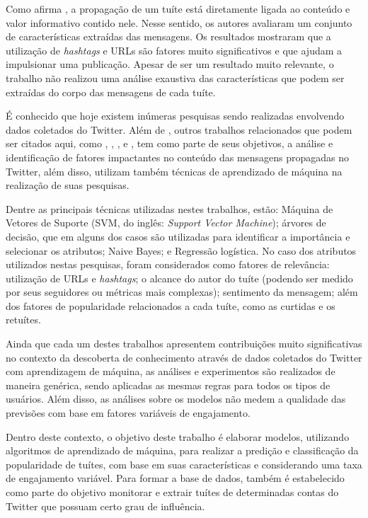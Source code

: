\documentclass[oneside,openright,12pt]{ufsm_2015} %
\begin{document}
{    \par Como afirma \cite{ieee:suh:10}, a propagação de um tuíte está diretamente ligada ao conteúdo e valor informativo contido nele. Nesse sentido, os autores avaliaram um conjunto de características extraídas das mensagens. Os resultados mostraram que a utilização de \textit{hashtags} e URLs são fatores muito significativos e que ajudam a impulsionar uma publicação. Apesar de ser um resultado muito relevante, o trabalho não realizou uma análise exaustiva das características que podem ser extraídas do corpo das mensagens de cada tuíte.
    
    \par É conhecido que hoje existem inúmeras pesquisas sendo realizadas envolvendo dados coletados do Twitter. Além de \cite{ieee:suh:10}, outros trabalhos relacionados que podem ser citados aqui, como \cite{acm:duan:2010}, \cite{benevenuto:2010}, \cite{acm:naveed:2011}, \cite{kharde:2016} e \cite{ieee:xu:2012}, tem como parte de seus objetivos, a análise e identificação de fatores impactantes no conteúdo das mensagens propagadas no Twitter, além disso, utilizam também técnicas de aprendizado de máquina na realização de suas pesquisas.
    
    \par Dentre as principais técnicas utilizadas nestes trabalhos, estão: Máquina de Vetores de Suporte (SVM, do inglês: \textit{Support Vector Machine}); árvores de decisão, que em alguns dos casos são utilizadas para identificar a importância e selecionar os atributos; Naive Bayes; e Regressão logística. No caso dos atributos utilizados nestas pesquisas, foram considerados como fatores de relevância: utilização de URLs e \textit{hashtags}; o alcance do autor do tuíte (podendo ser medido por seus seguidores ou métricas mais complexas); sentimento da mensagem; além dos fatores de popularidade relacionados a cada tuíte, como as curtidas e os retuítes.
    
    \par Ainda que cada um destes trabalhos apresentem contribuições muito significativas no contexto da descoberta de conhecimento através de dados coletados do Twitter com aprendizagem de máquina, as análises e experimentos são realizados de maneira genérica, sendo aplicadas as mesmas regras para todos os tipos de usuários. Além disso, as análises sobre os modelos não medem a qualidade das previsões com base em fatores variáveis de engajamento.

    \par Dentro deste contexto, o objetivo deste trabalho é elaborar modelos, utilizando algoritmos de aprendizado de máquina, para realizar a predição e classificação da popularidade de tuítes, com base em suas características e considerando uma taxa de engajamento variável. Para formar a base de dados, também é estabelecido como parte do objetivo monitorar e extrair tuítes de determinadas contas do Twitter que possuam certo grau de influência.
    
}
\end{document}
